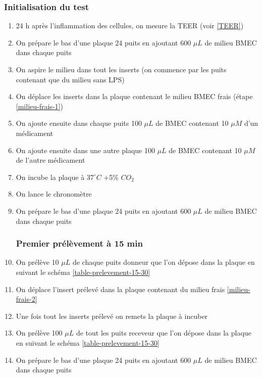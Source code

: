 \subsubsection{Initialisation du test}
\begin{enumerate}
\item 24 h après l'inflammation des cellules, on mesure la TEER (voir \ref{TEER})
\item On prépare le bas d'une plaque 24 puits en ajoutant 600 $\mu L$ de milieu BMEC dans chaque puits \label{milieu-frais-1}
\item On aspire le milieu dans tout les inserts (on commence par les puits contenant que du milieu sans LPS)
\item On déplace les inserts dans la plaque contenant le milieu BMEC frais (étape \ref{milieu-frais-1})
\item On ajoute ensuite dans chaque puits 100 $\mu L$ de BMEC contenant 10 $\mu M$ d'un médicament
\item On ajoute ensuite dans une autre plaque 100 $\mu L$ de BMEC contenant 10 $\mu M$ de l'autre médicament
\item On incube la plaque à $37^\circ C$ +5\% $CO_2$
\item On lance le chronomètre
\item On prépare le bas d'une plaque 24 puits  en ajoutant 600 $\mu L$ de milieu BMEC dans chaque puits \label{milieu-frais-2}
\subsubsection{Premier prélèvement à \textbf{15 min}}
\item On prélève 10 $\mu L$ de chaque puits donneur que l'on dépose dans la plaque en suivant le schéma \ref{table-prelevement-15-30}
\item On déplace l'insert prélevé dans la plaque contenant du milieu frais \ref{milieu-frais-2}
\item Une fois tout les inserts prélevé on remets la plaque à incuber
\item On prélève 100 $\mu L$ de tout les puits receveur que l'on dépose dans la plaque en suivant le schéma \ref{table-prelevement-15-30}
\item On prépare le bas d'une plaque 24 puits  en ajoutant 600 $\mu L$ de milieu BMEC dans chaque puits \label{milieu-frais-3}

\end{enumerate}
